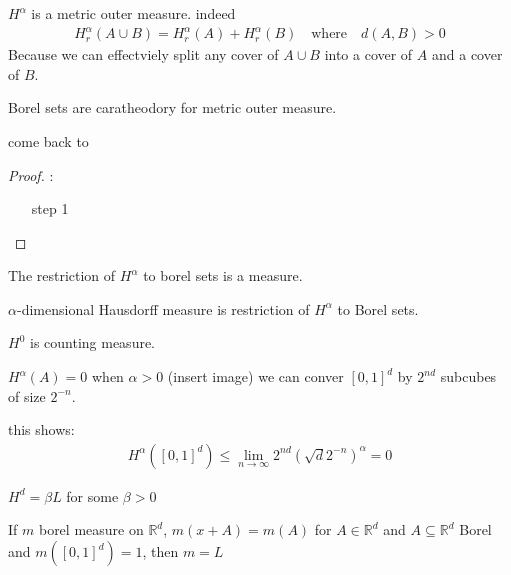 \begin{example}
	$H^{\alpha}$ is a metric outer measure. indeed
	\begin{align*}
	H_{r}^{\alpha}(A \cup B) = H_{r}^{\alpha}(A) + H_{r}^{\alpha}(B)  \quad \text{where} \quad d(A,B) > 0
	\end{align*} 
	Because we can effectviely split any cover of $A \cup B$ into a cover of $A$ and a cover of $B$.
\end{example}

\begin{lemma}
	Borel sets are caratheodory for metric outer measure.
\end{lemma}

come back to
\begin{proof}:
	\begin{enumerate}
		\item[step 1]
	\end{enumerate}
\end{proof}


\begin{theorem}
	The restriction of $H^{\alpha}$ to borel sets is a measure.
\end{theorem}


\begin{definition}
	$\alpha$-dimensional Hausdorff measure is restriction of $H^{\alpha}$ to Borel sets.
\end{definition}


\begin{example}
	$H^{0}$ is counting measure.
\end{example}


\begin{example}
	$H^{\alpha} (A) = 0$ when $\alpha > 0$ 
	(insert image) we can conver  $[0,1]^{d}$ by $2^{nd}$ subcubes of size $2^{-n}$.

	this shows:
	\begin{align*}
		H^{\alpha} ([0,1]^d) \leq \lim_{n \to \infty} 2^{nd}( \sqrt{d} 2^{-n})^{\alpha} = 0
	\end{align*}
\end{example}

\begin{example}
	$H^{d} = \beta L$ for some $\beta > 0$
\end{example}

\begin{theorem}
	If $m$ borel measure on $\mathbb{R}^{d}$, $m(x + A) = m(A)$ for $A \in \mathbb{R}^d$ and $A \subseteq \mathbb{R}^d$ Borel and $m([0,1]^{d}) =1$, then $m = L$
\end{theorem}

